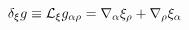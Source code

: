 \begin{equation}
\delta _{\xi }g\equiv {\cal L}_{\xi }g_{\alpha\rho
}=\nabla_{\alpha}\xi _{\rho}+\nabla_{\rho }\xi_{\alpha}
\label{eqn:31}
\end{equation}

